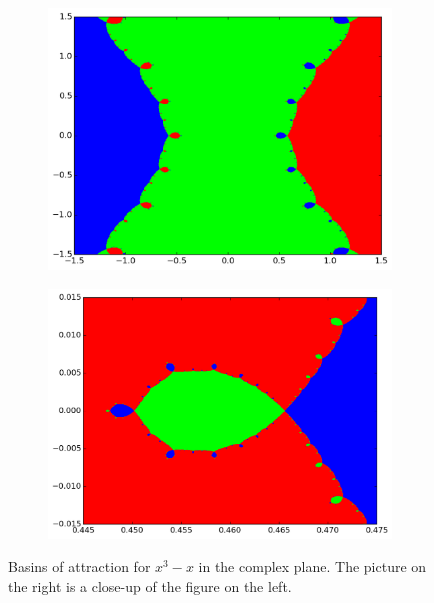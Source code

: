 \begin{figure}
\begin{center}
\begin{subfigure}[b]{.49\textwidth}
\centering
\includegraphics[width=\textwidth]{fractal_ex}
\end{subfigure}
\begin{subfigure}[b]{.49\textwidth}
\centering
\includegraphics[width=\textwidth]{fractal_zoom}
\end{subfigure}
\caption{ Basins of attraction for $x^3-x$ in the complex plane. 
The picture on the right is a close-up of the figure on the left.}
\label{fig:fractal_ex}
\end{center}
\end{figure}

